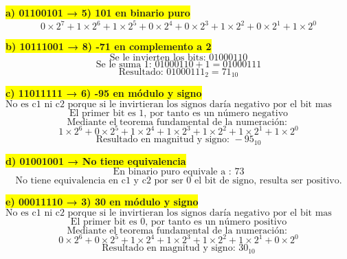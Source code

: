 \documentclass[a4paper,12pt]{article}
\begin{document}
	\begin{center}
		\colorbox{yellow}{{\textbf{a) 01100101 → 5) 101 en binario puro}}}
		{ }
		\[
		0\times2^{7} + 1\times2^{6} + 1\times2^{5} + 0\times2^{4} + 0\times2^{3} + 1\times2^{2} + 0\times2^{1} + 1\times2^{0}
		\]
	\end{center}

	\begin{center}
		\colorbox{yellow}{{\textbf{b) 10111001 → 8) -71 en complemento a 2}}}
		\[
		\text{Se le invierten los bits: } 01000110
		\]
		\[
		\text{Se le suma 1: } 01000110 + 1 = 01000111
		\]
		\[
		\boxed{\text{Resultado: } 01000111_2 = 71_{10}}
		\]
	\end{center}

	\begin{center}
		\colorbox{yellow}{{\textbf{c) 11011111 → 6) -95 en módulo y signo}}}
		\[
		\text{No es c1 ni c2 porque si le invirtieran los signos daría negativo por el bit mas significativo } 
		\]
		\[
		\text{El primer bit es 1, por tanto es un número negativo}
		\]
		\[
		{\text{Mediante el teorema fundamental de la numeración: } }
		\]
		\[
		1\times2^{6} + 0\times2^{5} + 1\times2^{4} + 1\times2^{3} + 1\times2^{2} + 1\times2^{1} + 1\times2^{0}
		\]
		\[
		\boxed{\text{Resultado en magnitud y signo: } -95_{10}}
		\]
	\end{center}
	
	
	
	
		\begin{center}
		\colorbox{yellow}{{\textbf{d) 01001001 → No tiene equivalencia }}}
		\[
		\text{En binario puro equivale a : } 73
		\]
		\[
		\text{No tiene equivalencia en c1 y c2 por ser 0 el bit de signo, resulta ser positivo.}
		\]
		\end{center}
	

	\begin{center}
		\colorbox{yellow}{{\textbf{e) 00011110 → 3) 30 en módulo y signo}}}
		\[
		\text{No es c1 ni c2 porque si le invirtieran los signos daría negativo por el bit mas significativo } 
		\]
		\[
		\text{El primer bit es 0, por tanto es un número positivo}
		\]
		\[
		{\text{Mediante el teorema fundamental de la numeración: } }
		\]
		\[
		0\times2^{6} + 0\times2^{5} + 1\times2^{4} + 1\times2^{3} + 1\times2^{2} + 1\times2^{1} + 0\times2^{0} 
		\]
		\[
		\boxed{\text{Resultado en magnitud y signo: } 30_{10}}
		\]
	\end{center}
\end{document}
